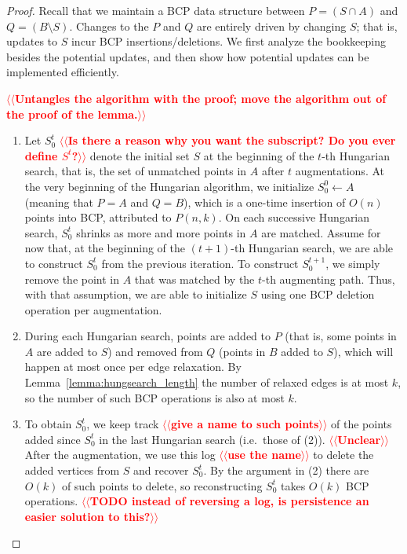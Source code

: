 \documentclass[11pt]{article}
\makeatletter
\theoremstyle{plain}
\numberwithin{figure}{section}
\def\n@te#1{\textsf{\boldmath \textbf{$\langle\!\langle$#1$\rangle\!\rangle$}}\leavevmode}
\def\note#1{\textcolor{red}{\n@te{#1}}}
\makeatother
\begin{document}
\begin{proof}
Recall that we maintain a BCP data structure between $P = (S \cap A)$ and
$Q = (B \setminus S)$.
Changes to the $P$ and $Q$ are entirely driven by changing $S$; that is,
updates to $S$ incur BCP insertions/deletions.
We first analyze the bookkeeping besides the potential updates, and then
show how potential updates can be implemented efficiently.

\note{Untangles the algorithm with the proof; move the algorithm out of the proof of the lemma.}

\begin{enumerate}
\item Let $S^t_0$ \note{Is there a reason why you want the subscript?  Do you ever define $S^t$?} denote the initial set $S$ at the beginning of the
	$t$-th Hungarian search, that is, the set of unmatched points in $A$
	after $t$ augmentations.
	At the very beginning of the Hungarian algorithm, we initialize
	$S^0_0 \gets A$ (meaning that $P = A$ and $Q = B$), which is a
	one-time insertion of $O(n)$ points into BCP, attributed to $P(n, k)$.
	On each successive Hungarian search, $S^t_0$ shrinks as more
	and more points in $A$ are matched.
	Assume for now that, at the beginning of the $(t+1)$-th
	Hungarian search, we are able to construct $S^t_0$ from the
	previous iteration.
	To construct $S^{t+1}_0$, we simply remove the point in $A$ that was
	matched by the $t$-th augmenting path.
	Thus, with that assumption, we are able to initialize $S$ using
	one BCP deletion operation per augmentation.

\item During each Hungarian search, points are added to $P$ (that is, some points in $A$ are
	added to $S$) and removed from $Q$ (points in $B$ added to $S$), which will happen at most once per edge relaxation.
	By Lemma~\ref{lemma:hungsearch_length} the number of relaxed
	edges is at most $k$, so the number of such BCP operations is
	also at most $k$.

\item To obtain $S^t_0$, we keep track \note{give a name to such points} of the
	points added since $S^t_0$ in the last Hungarian search
	(i.e.\ those of (2)). \note{Unclear}
	After the augmentation, we use this log \note{use the name} to delete the added
	vertices from $S$ and recover $S^t_0$.
	By the argument in (2) there are $O(k)$ of such points to
	delete, so reconstructing $S^t_0$ takes $O(k)$ BCP operations.
	\note{TODO instead of reversing a log, is persistence an easier solution to this?}
\end{enumerate}


\end{proof}
\end{document}
